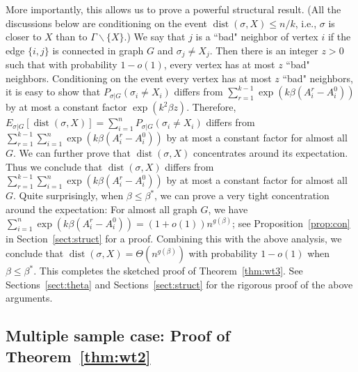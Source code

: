\documentclass[conference]{IEEEtran}
\DeclareMathOperator{\dist}{dist}
\begin{document}
More importantly, this allows us to prove a powerful structural result. (All the discussions below are conditioning on the event $\dist(\sigma,X)\le n/k$, i.e., $\sigma$ is closer to $X$ than to $\Gamma\backslash\{X\}$.) We say that $j$ is a ``bad" neighbor of vertex $i$ if the edge $\{i,j\}$ is connected in graph $G$ and $\sigma_j\neq X_j$. Then there is an integer $z>0$ such that with probability $1-o(1)$, every vertex has at most $z$ ``bad" neighbors.
Conditioning on the event every vertex has at most $z$ ``bad" neighbors, it is easy to show that $P_{\sigma|G}(\sigma_i \neq X_i)$ differs from $\sum_{r=1}^{k-1}\exp (k \beta (A^r_i-A^0_i))$ by at most a constant factor $\exp(k^2\beta z)$.
Therefore, $E_{\sigma|G}[\dist(\sigma,X)]=\sum_{i=1}^n P_{\sigma|G}(\sigma_i \neq X_i)$ differs from $\sum_{r=1}^{k-1} \sum_{i=1}^n\exp (k \beta (A^r_i-A^0_i))$ by at most a constant factor for almost all $G$.
We can further prove that $\dist(\sigma,X)$ concentrates around its expectation. Thus we conclude that $\dist(\sigma,X)$ differs from $\sum_{r=1}^{k-1} \sum_{i=1}^n\exp (k \beta (A^r_i-A^0_i))$ by at most a constant factor for almost all $G$.
Quite surprisingly, when $\beta\le\beta^\ast$, we can prove a very tight concentration around the expectation: For almost all graph $G$, we have $\sum_{i=1}^n\exp (k \beta (A^r_i-A^0_i))=(1+o(1))n^{g(\beta)}$; see Proposition~\ref{prop:con} in Section~\ref{sect:struct} for a proof. Combining this with the above analysis, we conclude that $\dist(\sigma,X)=\Theta(n^{g(\beta)})$ with probability $1-o(1)$ when $\beta\le\beta^\ast$. This completes the sketched proof of Theorem~\ref{thm:wt3}.
See Sections~\ref{sect:theta} and Sections~\ref{sect:struct} for the rigorous proof of the above arguments.

\subsection{Multiple sample case: Proof of Theorem~\ref{thm:wt2}}
\label{sect:multi}
\end{document}
